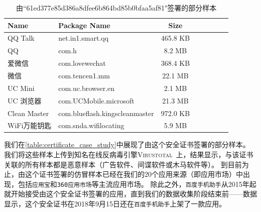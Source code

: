 \begin{table}[htbp]
	\renewcommand{\arraystretch}{1}
	\small
	\centering
	\caption{由``61ed377e85d386a8dfee6b864bd85b0bfaa5af81"签署的部分样本}
	\vspace{1mm}
	\begin{tabular}{l l c c c c c c}
		\toprule
		{\bf Name} & {\bf Package Name} & {\bf Size} \\
		\midrule
		QQ Talk  & net.in1.smart.qq & 465.8 KB \\
		QQ  & com.h & 8.2 MB \\
		爱微信  & com.lovewechat & 368.4 KB \\
		微信  & com.tencen1.mm & 22.1 MB \\
		UC Mini  & com.uc.browser.en & 2.1 MB \\
		UC 浏览器  & com.UCMobile.microsoft & 21.3 MB \\
		Clean Master  & com.blueflash.kingscleanmaster & 972.0 KB \\
		WiFi万能钥匙  & com.snda.wifilocating & 5.9 MB \\
		\bottomrule
	\end{tabular}
	\label{table:certificate_case_study}
\end{table}

我们在\autoref{table:certificate_case_study}中展现了由这个安全证书签署的部分样本。
我们将这些样本上传到知名在线反病毒引擎\textsc{Virustotal}~\cite{virustotal}上，结果显示，与该证书关联的所有样本都是恶意样本（广告软件、间谍软件或木马软件等）。
到目前为止，由这个证书签署的仿冒样本已经在我们的20个应用来源（即应用市场）中出现，包括\texttt{应用宝}和\texttt{360应用市场}等主流应用市场。
除此之外，\texttt{百度手机助手}从2015年起就开始接受由这个安全证书签署的应用，直到我们的数据收集阶段结束前——数据显示，这个安全证书在2018年9月15日还在\texttt{百度手机助手}上架了一款应用。

